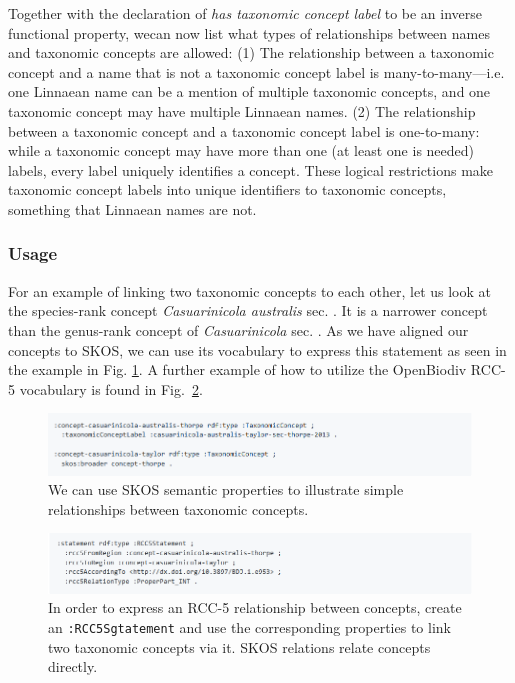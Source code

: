 Together with the declaration of \emph{has taxonomic concept label} to be an inverse functional property, wecan now list what types of relationships between names and taxonomic concepts are allowed: (1) The relationship between a taxonomic concept and a name that is not a taxonomic concept label is many-to-many---i.e. one Linnaean name can be a mention of multiple taxonomic concepts, and one taxonomic concept may have multiple Linnaean names. (2) The relationship between a taxonomic concept and a taxonomic concept label is one-to-many: while a taxonomic concept may have more than one (at least one is needed) labels, every label uniquely identifies a concept. These logical restrictions make taxonomic concept labels into unique identifiers to taxonomic concepts, something that Linnaean names are not.

\subsubsection{Usage} For an example of linking two taxonomic concepts to each other, let us look at the species-rank concept \emph{Casuarinicola australis} \cite{taylor_casuarinicola_2010} sec. \cite{thorpe_casuarinicola_2013}. It is a narrower concept than the genus-rank concept of \emph{Casuarinicola} \cite{taylor_casuarinicola_2010} sec. \cite{taylor_casuarinicola_2010}. As we have aligned our concepts to SKOS, we can use its vocabulary to express this statement as seen in the example in Fig. \ref{example-simple-taxonomic-concept-relationships}. A further example of how to utilize the OpenBiodiv RCC-5 vocabulary is found in Fig.~\ref{example-rcc5-taxonomic-concept-relationships}.

\begin{figure}[h!]
\centering
  \includegraphics[width=\textwidth]{Figures/example-simple-taxonomic-concept-relationships}
  \decoRule
  \caption[Example simple taxonomic concept relationships.]
  {We can use SKOS semantic properties to illustrate simple relationships between taxonomic concepts.}
  \label{example-simple-taxonomic-concept-relationships}
\end{figure}

\begin{figure}[h!]
\centering
  \includegraphics[width=\textwidth]{Figures/example-rcc5-taxonomic-concept-relationships}
  \decoRule
  \caption[Example of RCC-5 taxonomic concept relationships.]{In order to express an RCC-5 relationship between concepts, create an {\tt :RCC5Sgtatement} and use the corresponding properties to link two taxonomic concepts via it. SKOS relations relate concepts directly.}
  \label{example-rcc5-taxonomic-concept-relationships}
\end{figure}

